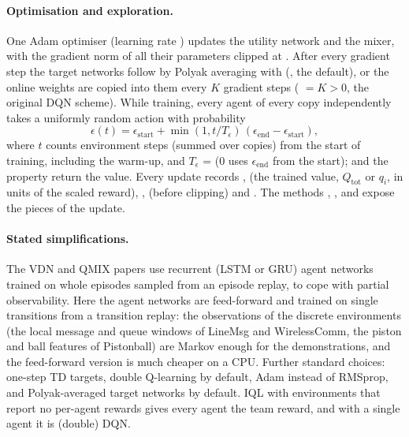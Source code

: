 \paragraph{Optimisation and exploration.} One Adam optimiser (learning rate
) updates the utility network and the mixer, with the gradient norm of
all their parameters clipped at . After every gradient
step the target networks follow by Polyak averaging with 
(, the default), or the online weights are
copied into them every $K$ gradient steps (
$= K > 0$, the original DQN scheme). While training, every agent of every copy
independently takes a uniformly random action with probability
\begin{equation}
  \epsilon(t) = \epsilon_\text{start} + \min(1, t / T_\epsilon)\,
      (\epsilon_\text{end} - \epsilon_\text{start}),
\end{equation}
where $t$ counts environment steps (summed over copies) from the start of
training, including the warm-up, and $T_\epsilon$ =
 ($0$ uses $\epsilon_\text{end}$ from the start);
 and the property  return the value. Every
update records ,  (the trained value,
$Q_\text{tot}$ or $q_i$, in units of the scaled reward), ,
 (before clipping) and . The methods
, ,  and  expose the
pieces of the update.

\paragraph{Stated simplifications.} The VDN and QMIX papers use recurrent
(LSTM or GRU) agent networks trained on whole episodes sampled from an
episode replay, to cope with partial observability. Here the agent networks
are feed-forward and trained on single transitions from a transition replay:
the observations of the discrete environments (the local message and queue
windows of LineMsg and WirelessComm, the piston and ball features of
Pistonball) are Markov enough for the demonstrations, and the feed-forward
version is much cheaper on a CPU. Further standard choices: one-step TD
targets, double Q-learning by default, Adam instead of RMSprop, and
Polyak-averaged target networks by default. IQL with environments that report
no per-agent rewards gives every agent the team reward, and with a single
agent it is (double) DQN.

